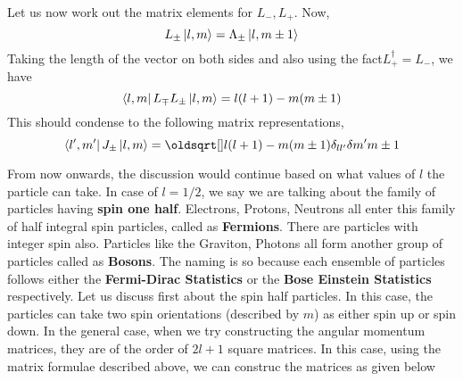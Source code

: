 \documentclass[12pt]{article}
\begin{document}
Let us now work out the matrix elements for $L_-,L_+$. Now, $$L_{\pm}\Ket{l,m} = \Lambda_{\pm}\Ket{l, m\pm1}$$ Taking the length of the vector on both sides and also using the fact$ L_+^{\dag} = L_-$, we have $$\Bra{l,m}L_{\mp}L_{\pm}\Ket{l,m} = {l(l+1) - m(m\pm1)}$$
This should condense to the following matrix representations,
$$\Bra{l',m'}J_{\pm}\Ket{l,m} = \sqrt{l(l+1)-m(m\pm1)}\delta_{ll'}\delta{m'm\pm1}$$

From now onwards, the discussion would continue based on what values of $l$ the particle can take. In case of $l = 1/2$, we say we are talking about the family of particles having \textbf{spin one half}. Electrons, Protons, Neutrons all enter this family of half integral spin particles, called as \textbf{Fermions}. There are particles with integer spin also. Particles like the Graviton, Photons all form another group of particles called as \textbf{Bosons}. The naming is so because each ensemble of particles follows either the \textbf{Fermi-Dirac Statistics} or the \textbf{Bose Einstein Statistics} respectively. Let us discuss first about the spin half particles. In this case, the particles can take two spin orientations (described by $m$) as either spin up or spin down. In the general case, when we try constructing the angular momentum matrices, they are of the order of $2l+1$ square matrices. In this case, using the matrix formulae described above, we can construc the matrices as given below
\end{document}
